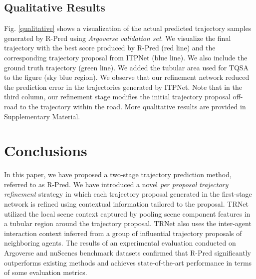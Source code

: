 \documentclass[10pt,twocolumn,letterpaper]{article}
\begin{document}
\begin{table} [ht]
    \centering {}
    \vspace{-5.0pt}
    \caption{Ablation study. Comparison of per-proposal scene context versus shared scene context evaluated on the \textit{Argoverse validation set}.}
        \label{permodal} 
\end{table}

\vspace{-10.0pt}
\subsection{Qualitative Results}

 Fig. \ref{qualitative} shows a visualization of the actual predicted trajectory samples generated by R-Pred using {\it Argoverse validation set}. We visualize the final trajectory with the best  score produced by R-Pred (red line) and the corresponding trajectory proposal from ITPNet (blue line). We also include the ground truth trajectory (green line). We added the tubular area used for TQSA to the figure (sky blue region). We observe that our refinement network reduced the prediction error in the trajectories generated by ITPNet. Note that in the third column, our refinement stage modifies the initial trajectory proposal off-road to the trajectory within the road. More qualitative results are provided in Supplementary Material.




\section{Conclusions}

In this paper, we have proposed a two-stage trajectory prediction method, referred to as R-Pred. We have introduced a novel {\it per proposal trajectory refinement} strategy in which each trajectory proposal generated in the first-stage network is refined using contextual information tailored to the proposal.  TRNet utilized the local scene context captured by pooling scene component features in a tubular region around the trajectory proposal. 
TRNet also uses the inter-agent interaction context inferred from a group of influential trajectory proposals of neighboring agents. 
The results of an experimental evaluation conducted on Argoverse and nuScenes benchmark datasets confirmed that R-Pred significantly outperforms existing methods and achieves state-of-the-art performance in terms of some evaluation metrics. 
\end{document}
